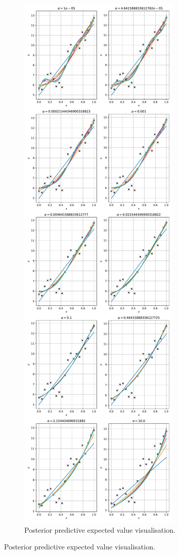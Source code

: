 \documentclass{article}
\begin{document}
\begin{figure}
\begin{subfigure}[b]{.45\textwidth}
\end{subfigure}
\qquad
\begin{subfigure}[b]{.35\textwidth}
\includegraphics[width=\textwidth]{Q2_6.pdf}
\caption{Posterior predictive expected value visualisation.}
\end{subfigure}


\end{figure}
\end{document}

